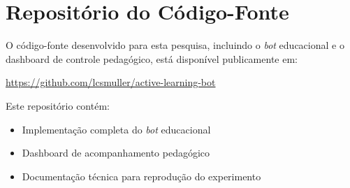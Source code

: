 \chapter{Repositório do Código-Fonte}
\label{appendix:repo}

O código-fonte desenvolvido para esta pesquisa, incluindo o \textit{bot}
educacional e o dashboard de controle pedagógico, está disponível publicamente
em:

\begin{center}
\url{https://github.com/lcsmuller/active-learning-bot}
\end{center}

Este repositório contém:
\begin{itemize}
    \item Implementação completa do \textit{bot} educacional
    \item Dashboard de acompanhamento pedagógico
    \item Documentação técnica para reprodução do experimento
\end{itemize}
